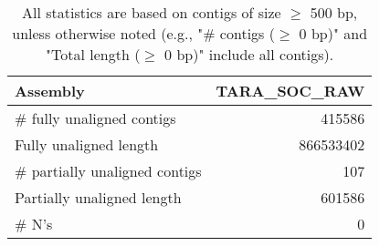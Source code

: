 \documentclass[12pt,a4paper]{article}
\begin{document}
\begin{table}[ht]
\begin{center}
\caption{All statistics are based on contigs of size $\geq$ 500 bp, unless otherwise noted (e.g., "\# contigs ($\geq$ 0 bp)" and "Total length ($\geq$ 0 bp)" include all contigs).}
\begin{tabular}{|l*{1}{|r}|}
\hline
Assembly & TARA\_SOC\_RAW \\ \hline
\# fully unaligned contigs & 415586 \\ \hline
Fully unaligned length & 866533402 \\ \hline
\# partially unaligned contigs & 107 \\ \hline
Partially unaligned length & 601586 \\ \hline
\# N's & 0 \\ \hline
\end{tabular}
\end{center}
\end{table}
\end{document}
